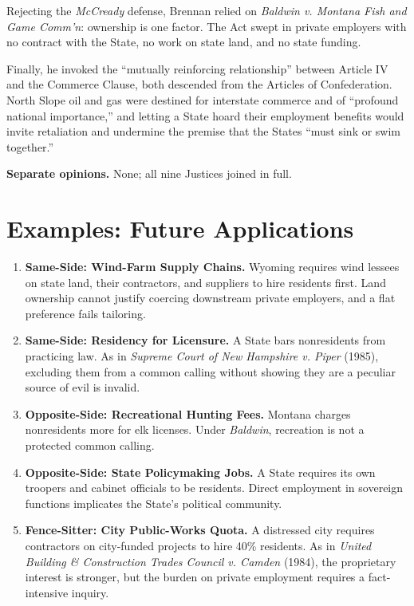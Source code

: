 \documentclass[12pt]{article}
\begin{document}
Rejecting the \textit{McCready} defense, Brennan relied on \textit{Baldwin v. Montana Fish and Game Comm'n}: ownership is one factor. The Act swept in private employers with no contract with the State, no work on state land, and no state funding.

Finally, he invoked the ``mutually reinforcing relationship'' between Article IV and the Commerce Clause, both descended from the Articles of Confederation. North Slope oil and gas were destined for interstate commerce and of ``profound national importance,'' and letting a State hoard their employment benefits would invite retaliation and undermine the premise that the States ``must sink or swim together.''

\textbf{Separate opinions.} None; all nine Justices joined in full.

\section{Examples: Future Applications}

\begin{enumerate}
\item \textbf{Same-Side: Wind-Farm Supply Chains.} Wyoming requires wind lessees on state land, their contractors, and suppliers to hire residents first. Land ownership cannot justify coercing downstream private employers, and a flat preference fails tailoring.
\item \textbf{Same-Side: Residency for Licensure.} A State bars nonresidents from practicing law. As in \textit{Supreme Court of New Hampshire v. Piper} (1985), excluding them from a common calling without showing they are a peculiar source of evil is invalid.
\item \textbf{Opposite-Side: Recreational Hunting Fees.} Montana charges nonresidents more for elk licenses. Under \textit{Baldwin}, recreation is not a protected common calling.
\item \textbf{Opposite-Side: State Policymaking Jobs.} A State requires its own troopers and cabinet officials to be residents. Direct employment in sovereign functions implicates the State's political community.
\item \textbf{Fence-Sitter: City Public-Works Quota.} A distressed city requires contractors on city-funded projects to hire 40\% residents. As in \textit{United Building \& Construction Trades Council v. Camden} (1984), the proprietary interest is stronger, but the burden on private employment requires a fact-intensive inquiry.
\end{enumerate}
\end{document}
